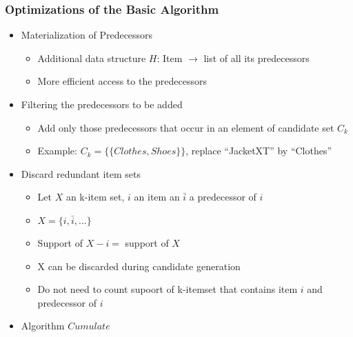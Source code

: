 \documentclass[../notes.tex]{subfiles}
\begin{document}
\subsubsection{Optimizations of the Basic Algorithm}
\begin{itemize}
  \item Materialization of Predecessors
  \begin{itemize}
    \item Additional data structure $H$: Item $\rightarrow$ list of all its predecessors
    \item More efficient access to the predecessors 
  \end{itemize}

  \item Filtering the predecessors to be added
  \begin{itemize}
    \item Add only those predecessors that occur in an element of candidate set $C_k$
    \item Example: $C_k = \{\{Clothes, Shoes\}\}$, replace ``JacketXT'' by ``Clothes''
  \end{itemize}

  \item Discard redundant item sets
  \begin{itemize}
    \item Let $X$ an k-item set, $i$ an item an $\bar{i}$ a predecessor of $i$
    \item $X = \{i, \bar{i}, ...\}$
    \item Support of $X - {i} = $ support of $X$
    \item X can be discarded during candidate generation
    \item Do not need to count supoort of k-itemset that contains item $i$ and predecessor of $i$
  \end{itemize} 

  \item Algorithm $Cumulate$
\end{itemize} 
\end{document}
